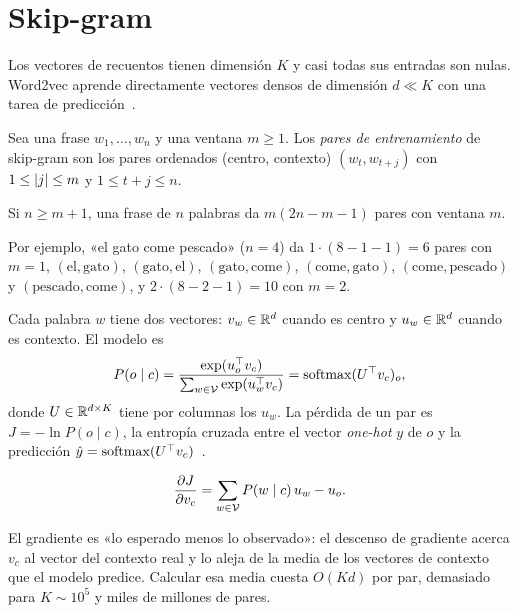\section{Skip-gram}

Los vectores de recuentos tienen dimensión $K$ y casi todas sus entradas son nulas. Word2vec aprende directamente vectores densos de dimensión $d\ll K$ con una tarea de predicción~\cite{mikolov13a}.

\begin{definicion}
Sea una frase $w_1,\dots,w_n$ y una ventana $m\ge 1$. Los \emph{pares de entrenamiento} de skip-gram son los pares ordenados (centro, contexto) $(w_t,w_{t+j})$ con $1\le\lvert j\rvert\le m$ y $1\le t+j\le n$.
\end{definicion}

\begin{proposicion}\label{prop:pares}
Si $n\ge m+1$, una frase de $n$ palabras da $m(2n-m-1)$ pares con ventana $m$.
\end{proposicion}

Por ejemplo, «el gato come pescado» ($n=4$) da $1\cdot(8-1-1)=6$ pares con $m=1$, $(\text{el},\text{gato})$, $(\text{gato},\text{el})$, $(\text{gato},\text{come})$, $(\text{come},\text{gato})$, $(\text{come},\text{pescado})$ y $(\text{pescado},\text{come})$, y $2\cdot(8-2-1)=10$ con $m=2$.

\begin{definicion}\label{def:skipgram}
Cada palabra $w$ tiene dos vectores: $v_w\in\mathbb{R}^{d}$ cuando es centro y $u_w\in\mathbb{R}^{d}$ cuando es contexto. El modelo es
\[
P(o\mid c)=\frac{\exp(u_o^{\top}v_c)}{\sum_{w\in\mathcal{V}}\exp(u_w^{\top}v_c)}=\operatorname{softmax}(U^{\top}v_c)_o,
\]
donde $U\in\mathbb{R}^{d\times K}$ tiene por columnas los $u_w$. La pérdida de un par es $J=-\ln P(o\mid c)$, la entropía cruzada entre el vector \emph{one-hot} $y$ de $o$ y la predicción $\hat y=\operatorname{softmax}(U^{\top}v_c)$~\cite{cs224n}.
\end{definicion}

\begin{proposicion}\label{prop:grad-vc}
\[
\frac{\partial J}{\partial v_c}=\sum_{w\in\mathcal{V}}P(w\mid c)\,u_w-u_o.
\]
\end{proposicion}

El gradiente es «lo esperado menos lo observado»: el descenso de gradiente acerca $v_c$ al vector del contexto real y lo aleja de la media de los vectores de contexto que el modelo predice. Calcular esa media cuesta $O(Kd)$ por par, demasiado para $K\sim 10^{5}$ y miles de millones de pares.

